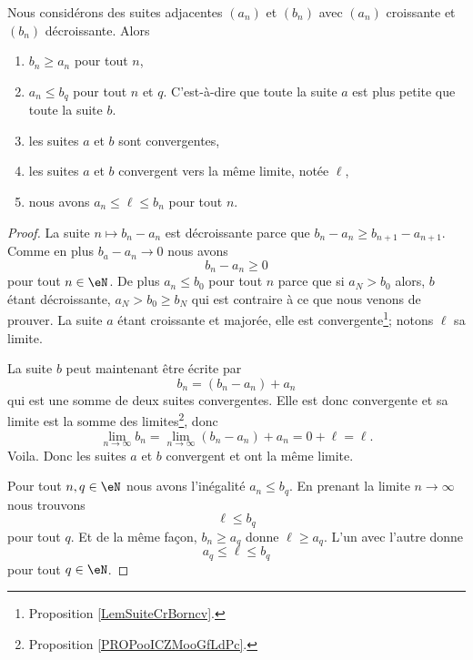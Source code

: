 \begin{theorem}      \label{THOooZJWLooAtGMxD}
    Nous considérons des suites adjacentes \( (a_n)\) et \( (b_n)\) avec \( (a_n)\) croissante et \( (b_n)\) décroissante. Alors
    \begin{enumerate}
        \item
            \( b_n\geq a_n\) pour tout \( n\),
        \item
            \( a_n\leq b_q\) pour tout \( n\) et \( q\). C'est-à-dire que toute la suite \( a\) est plus petite que toute la suite \( b\).
        \item
            les suites \( a\) et \( b\) sont convergentes,
        \item
            les suites \( a\) et \( b\) convergent vers la même limite, notée \( \ell\),
        \item
            nous avons \( a_n\leq \ell\leq b_n\) pour tout \( n\).
    \end{enumerate}
\end{theorem}

\begin{proof}
    La suite \( n\mapsto b_n-a_n\) est décroissante parce que \( b_n-a_n\geq b_{n+1}-a_{n+1}\). Comme en plus \( b_a-a_n\to 0\) nous avons
    \begin{equation}
        b_n-a_n\geq 0
    \end{equation}
    pour tout \( n\in \eN\). De plus \( a_n\leq b_0\) pour tout \( n\) parce que si \( a_N>b_0\) alors, \( b\) étant décroissante, \( a_N>b_0\geq b_N\) qui est contraire à ce que nous venons de prouver. La suite \( a\) étant croissante et majorée, elle est convergente\footnote{Proposition \ref{LemSuiteCrBorncv}.}; notons \( \ell\) sa limite.

    La suite \( b\) peut maintenant être écrite par
    \begin{equation}
        b_n=(b_n-a_n)+a_n
    \end{equation}
    qui est une somme de deux suites convergentes. Elle est donc convergente et sa limite est la somme des limites\footnote{Proposition \ref{PROPooICZMooGfLdPc}.}, donc
    \begin{equation}
        \lim_{n\to \infty} b_n=\lim_{n\to \infty} (b_n-a_n)+a_n=0+\ell=\ell.
    \end{equation}
    Voila. Donc les suites \( a\) et \( b\) convergent et ont la même limite.

    Pour tout \( n,q\in \eN\) nous avons l'inégalité \( a_n\leq b_q\). En prenant la limite \( n\to \infty\) nous trouvons
    \begin{equation}
        \ell\leq b_q
    \end{equation}
    pour tout \( q\). Et de la même façon, \( b_n\geq a_q\) donne \( \ell\geq a_q\). L'un avec l'autre donne
    \begin{equation}
        a_q\leq \ell\leq b_q
    \end{equation}
    pour tout \( q\in \eN\).
\end{proof}

